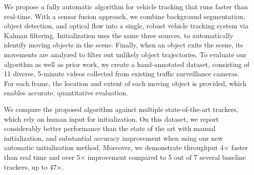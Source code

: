 We propose a fully automatic algorithm for vehicle tracking that runs faster than real-time. With a sensor fusion approach, we combine background segmentation, object detection, and optical flow into a single, robust vehicle tracking system via Kalman filtering. Initialization uses the same three sources, to automatically identify moving objects in the scene. Finally, when an object exits the scene, its movements are analyzed to filter out unlikely object trajectories. To evaluate our algorithm as well as prior work, we create a hand-annotated dataset, consisting of 11 diverse, 5-minute videos collected from existing traffic surveillance cameras. For each frame, the location and extent of each moving object is provided, which enables accurate, quantitative evaluation.

We compare the proposed algorithm against multiple state-of-the-art trackers, which rely on human input for initialization.
On this dataset, we report considerably better performance than the state of the art with manual initialization, and substantial accuracy improvement when using our new automatic initialization method. Moreover, we demonstrate throughput 4$\times$ faster than real time and over 5$\times$ improvement compared to 5 out of 7 several baseline trackers, up to 47$\times$. 





